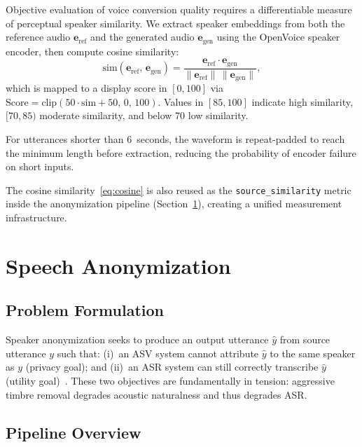 \documentclass[conference]{IEEEtran}
\begin{document}
Objective evaluation of voice conversion quality requires a
differentiable measure of perceptual speaker similarity.
We extract speaker embeddings from both the reference audio
$\mathbf{e}_\text{ref}$ and the generated audio
$\mathbf{e}_\text{gen}$ using the OpenVoice speaker encoder,
then compute cosine similarity:
\begin{equation}
  \text{sim}(\mathbf{e}_\text{ref},\,\mathbf{e}_\text{gen})
    = \frac{\mathbf{e}_\text{ref} \cdot \mathbf{e}_\text{gen}}
           {\|\mathbf{e}_\text{ref}\|\,\|\mathbf{e}_\text{gen}\|},
  \label{eq:cosine}
\end{equation}
which is mapped to a display score in $[0,100]$ via
$\text{Score} = \text{clip}(50\cdot\text{sim}+50,\,0,\,100)$.
Values in $[85,100]$ indicate high similarity, $[70,85)$
moderate similarity, and below 70 low similarity.

For utterances shorter than 6~seconds, the waveform is
repeat-padded to reach the minimum length before extraction,
reducing the probability of encoder failure on short inputs.

The cosine similarity~\eqref{eq:cosine} is also reused as the
\texttt{source\_similarity} metric inside the anonymization pipeline
(Section~\ref{sec:anon}), creating a unified measurement infrastructure.

\section{Speech Anonymization}
\label{sec:anon}

\subsection{Problem Formulation}

Speaker anonymization seeks to produce an output utterance $\hat{y}$
from source utterance $y$ such that:
(i)~an ASV system cannot attribute $\hat{y}$ to the same speaker as
$y$ (privacy goal); and (ii)~an ASR system can still correctly
transcribe $\hat{y}$ (utility goal)~\cite{b_voiceprivacy2020}.
These two objectives are fundamentally in tension: aggressive
timbre removal degrades acoustic naturalness and thus degrades ASR.

\subsection{Pipeline Overview}
\end{document}
